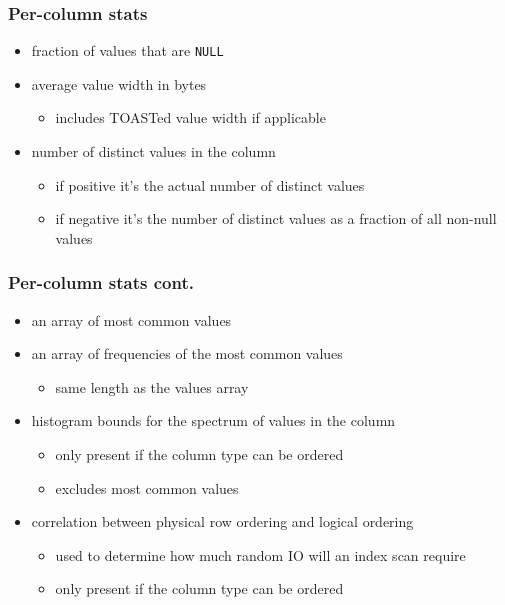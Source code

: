 \documentclass{beamer}
\begin{document}
\begin{frame}
  \frametitle{Per-column stats}

  \begin{itemize}
  \item fraction of values that are \alert{\texttt{NULL}}
  \item average value \alert{width in bytes}
    \begin{itemize}
    \item includes TOASTed value width if applicable
    \end{itemize}
  \item number of \alert{distinct values} in the column
    \begin{itemize}
    \item if \alert{positive} it's the actual number of distinct values
    \item if \alert{negative} it's the number of distinct values as a fraction of all
      non-null values
    \end{itemize}
  \end{itemize}
\end{frame}

\begin{frame}
  \frametitle{Per-column stats cont.}

  \begin{itemize}
  \item an array of \alert{most common} values
  \item an array of \alert{frequencies} of the most common values
    \begin{itemize}
    \item same length as the values array
    \end{itemize}
  \item \alert{histogram bounds} for the spectrum of values in the column
    \begin{itemize}
    \item only present if the column type can be \alert{ordered}
    \item excludes most common values
    \end{itemize}
  \item \alert{correlation} between physical row ordering and logical ordering
    \begin{itemize}
    \item used to determine how much random IO will an index scan require
    \item only present if the column type can be \alert{ordered}
    \end{itemize}
  \end{itemize}
\end{frame}
\end{document}
